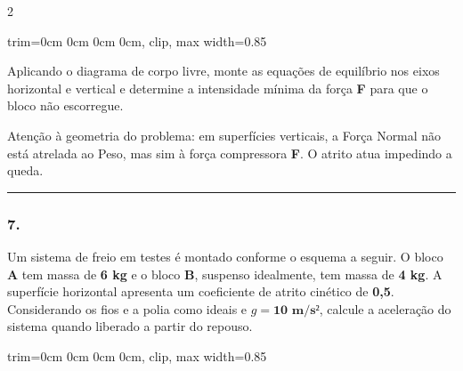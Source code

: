 \documentclass[twoside, 10pt, a4paper]{article}
\newlength{\espacoPreQuestao}\setlength{\espacoPreQuestao}{0.1cm}
\newlength{\espacoQuestao}\setlength{\espacoQuestao}{0.2cm}
\newcommand{\larguraTikz}{0.85\linewidth}
\begin{document}
\begin{multicols*}{2}
\begin{center}
\begin{adjustbox}{trim=0cm 0cm 0cm 0cm, clip, max width=\larguraTikz}
\end{adjustbox}
\end{center}

Aplicando o diagrama de corpo livre, monte as equações de equilíbrio nos eixos horizontal e vertical e determine a intensidade mínima da força \textbf{F} para que o bloco não escorregue.
\par\vspace{\espacoQuestao}

\begin{boxdica}
Atenção à geometria do problema: em superfícies verticais, a Força Normal não está atrelada ao Peso, mas sim à força compressora \textbf{F}. O atrito atua impedindo a queda.
\end{boxdica}
\par\vspace{\espacoQuestao}

\noindent\textcolor{CorLinha}{\rule{\linewidth}{0.5pt}} 
\par\vspace{\espacoPreQuestao}
\subsubsection*{7.} Um sistema de freio em testes é montado conforme o esquema a seguir. O bloco \textbf{A} tem massa de \textbf{6 kg} e o bloco \textbf{B}, suspenso idealmente, tem massa de \textbf{4 kg}. A superfície horizontal apresenta um coeficiente de atrito cinético de \textbf{0,5}. Considerando os fios e a polia como ideais e $g = \textbf{10 m/s²}$, calcule a aceleração do sistema quando liberado a partir do repouso.

\begin{center}
\begin{adjustbox}{trim=0cm 0cm 0cm 0cm, clip, max width=\larguraTikz}
\end{adjustbox}
\end{center}
\end{multicols*}
\end{document}
